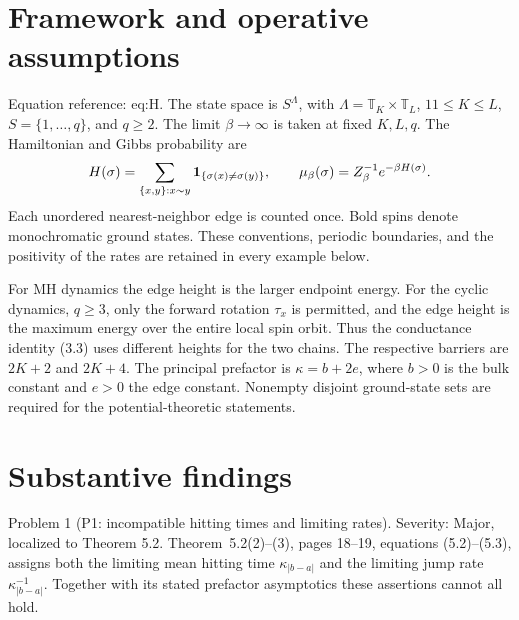 \documentclass[10pt]{article}
\begin{document}
\section*{Framework and operative assumptions}
Equation reference: eq:H. The state space is \(S^\Lambda\), with \(\Lambda=\mathbb T_K\times\mathbb T_L\), \(11\leq K\leq L\), \(S=\{1,\ldots,q\}\), and \(q\geq2\). The limit \(\beta\to\infty\) is taken at fixed \(K,L,q\). The Hamiltonian and Gibbs probability are \[
 H(\sigma)=\sum_{\{x,y\}:x\sim y}{\bf1}_{\{\sigma(x)\ne\sigma(y)\}},
 \qquad \mu_\beta(\sigma)=Z_\beta^{-1}e^{-\beta H(\sigma)}.\] Each unordered nearest-neighbor edge is counted once. Bold spins denote monochromatic ground states. These conventions, periodic boundaries, and the positivity of the rates are retained in every example below.\par
For MH dynamics the edge height is the larger endpoint energy. For the cyclic dynamics, \(q\geq3\), only the forward rotation \(\tau_x\) is permitted, and the edge height is the maximum energy over the entire local spin orbit. Thus the conductance identity (3.3) uses different heights for the two chains. The respective barriers are \(2K+2\) and \(2K+4\). The principal prefactor is \(\kappa=b+2e\), where \(b>0\) is the bulk constant and \(e>0\) the edge constant. Nonempty disjoint ground-state sets are required for the potential-theoretic statements.\par
\section*{Substantive findings}
Problem 1 (P1: incompatible hitting times and limiting rates).  Severity: Major, localized to Theorem 5.2. Theorem 5.2(2)–(3), pages 18–19, equations (5.2)–(5.3), assigns both the limiting mean hitting time \(\kappa_{|b-a|}\) and the limiting jump rate \(\kappa_{|b-a|}^{-1}\). Together with its stated prefactor asymptotics these assertions cannot all hold.\par
\end{document}
